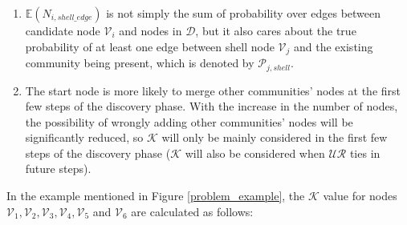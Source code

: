 \documentclass[\main/thesis.tex]{subfiles}
\begin{document}
\begin{enumerate}
\item $\mathbb{E}(N_{i,shell\_edge})$ is not simply the sum of probability over edges between candidate node $\mathcal{V}_i$ and nodes in $\mathcal{D}$, but it also cares about the true probability of at least one edge between shell node $\mathcal{V}_j$ and the existing community being present, which is denoted by $\mathcal{P}_{j,shell}$.
\item The start node is more likely to merge other communities' nodes at the first few steps of the discovery phase. With the increase in the number of nodes, the possibility of wrongly adding other communities' nodes will be significantly reduced, so $\mathcal{K}$ will only be mainly considered in the first few steps of the discovery phase ($\mathcal{K}$ will also be considered when $\mathcal{UR}$ ties in future steps). %
\end{enumerate}

In the example mentioned in Figure \ref{problem_example}, the $\mathcal{K}$ value for nodes $\mathcal{V}_1, \mathcal{V}_2, \mathcal{V}_3, \mathcal{V}_4, \mathcal{V}_5$ and $\mathcal{V}_6$ are calculated as follows:
\end{document}
